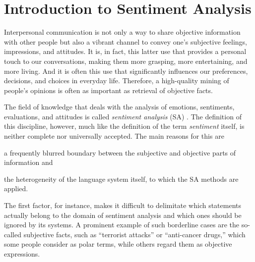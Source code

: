 


\chapter{Introduction to Sentiment Analysis}\label{chap:introduction}

Interpersonal communication is not only a way to share objective
information with other people but also a vibrant channel to convey
one's subjective feelings, impressions, and attitudes.  It is, in
fact, this latter use that provides a personal touch to our
conversations, making them more grasping, more entertaining, and more
living.  And it is often this use that significantly influences our
preferences, decisions, and choices in everyday life.  Therefore, a
high-quality mining of people's opinions is often as important as
retrieval of objective facts.

The field of knowledge that deals with the analysis of emotions,
sentiments, evaluations, and attitudes is called \emph{sentiment
  analysis} (SA) \citep{Liu:12}.  The definition of this discipline,
however, much like the definition of the term \emph{sentiment} itself,
is neither complete nor universally accepted.  The main reasons for
this are
\begin{inparaenum}[(i)]
  \item a frequently blurred boundary between the subjective and
    objective parts of information and
  \item the heterogeneity of the language system itself, to which the
    SA methods are applied.
\end{inparaenum}

The first factor, for instance, makes it difficult to delimitate which
statements actually belong to the domain of sentiment analysis and
which ones should be ignored by its systems.  A prominent example of
such borderline cases are the so-called subjective facts, such as
``terrorist attacks'' or ``anti-cancer drugs,'' which some people
consider as polar terms, while others regard them as objective
expressions.

